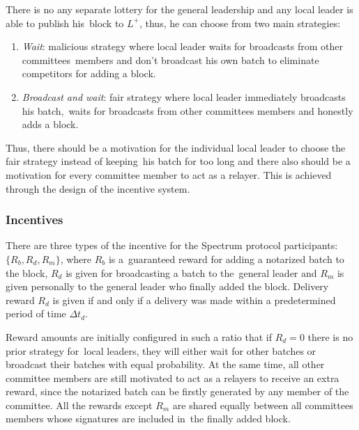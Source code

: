 There is no any separate lottery for the general leadership and any local leader is able to publish his\
block to $L^+$, thus, he can choose from two main strategies:
\begin{enumerate}
    \item \emph{Wait}: malicious strategy where local leader waits for broadcasts from other committees\
    members and don't broadcast his own batch to eliminate competitors for adding a block.
    \item \emph{Broadcast and wait}: fair strategy where local leader immediately broadcasts his batch,\
    waits for broadcasts from other committees members and honestly adds a block.
\end{enumerate}
Thus, there should be a motivation for the individual local leader to choose the fair strategy instead of keeping\
his batch for too long and there also should be a motivation for every committee member to act as a relayer.
This is achieved through the design of the incentive system.

\subsubsection{Incentives}

There are three types of the incentive for the Spectrum protocol participants: ${\{R_b, R_d, R_m\}}$, where $R_b$ is a\
guaranteed reward for adding a notarized batch to the block, $R_d$ is given for broadcasting a batch to the\
general leader and $R_m$ is given personally to the general leader who finally added the block.
Delivery reward $R_d$ is given if and only if a delivery was made within a predetermined period of time $\Delta t_d$.

Reward amounts are initially configured in such a ratio that if ${R_d=0}$ there is no prior strategy for\
local leaders, they will either wait for other batches or broadcast their batches with equal probability.
At the same time, all other committee members are still motivated to act as a relayers to receive an extra reward,
since the notarized batch can be firstly generated by any member of the committee.
All the rewards except $R_m$ are shared equally between all committees members whose signatures are included in\
the finally added block.

